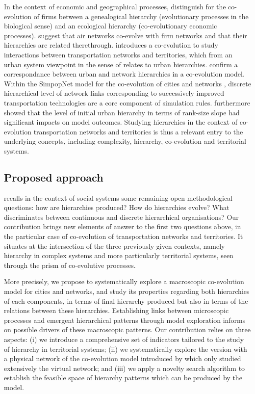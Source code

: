 \documentclass[english,fleqn,allpages]{ISTE_science}[2018/07/30]
\begin{document}
In the context of economic and geographical processes, \cite{volberda2003co} distinguish for the co-evolution of firms between a genealogical hierarchy (evolutionary processes in the biological sense) and an ecological hierarchy (co-evolutionary economic processes). \cite{liu2013exploring} suggest that air networks co-evolve with firm networks and that their hierarchies are related therethrough. \cite{raimbault2019modeling} introduces a co-evolution to study interactions between transportation networks and territories, which from an urban system viewpoint in the sense of \cite{pumain2006evolutionary} relates to urban hierarchies. \cite{levinson2007co} confirm a correspondance between urban and network hierarchies in a co-evolution model. Within the SimpopNet model for the co-evolution of cities and networks \citep{schmitt2014modelisation}, discrete hierarchical level of network links corresponding to successively improved transportation technologies are a core component of simulation rules. \cite{raimbault2020unveiling} furthermore showed that the level of initial urban hierarchy in terms of rank-size slope had significant impacts on model outcomes. Studying hierarchies in the context of co-evolution transportation networks and territories is thus a relevant entry to the underlying concepts, including complexity, hierarchy, co-evolution and territorial systems.



\subsection{Proposed approach}

\cite{pumain2006introduction} recalls in the context of social systems some remaining open methodological questions: how are hierarchies produced? How do hierarchies evolve? What discriminates between continuous and discrete hierarchical organisations? Our contribution brings new elements of answer to the first two questions above, in the particular case of co-evolution of transportation networks and territories. It situates at the intersection of the three previously given contexts, namely hierarchy in complex systems and more particularly territorial systems, seen through the prism of co-evolutive processes.

More precisely, we propose to systematically explore a macroscopic co-evolution model for cities and networks, and study its properties regarding both hierarchies of each components, in terms of final hierarchy produced but also in terms of the relations between these hierarchies. Establishing links between microscopic processes and emergent hierarchical patterns through model exploration informs on possible drivers of these macroscopic patterns. Our contribution relies on three aspects: (i) we introduce a comprehensive set of indicators tailored to the study of hierarchy in territorial systems; (ii) we systematically explore the version with a physical network of the co-evolution model introduced by \cite{raimbault2018modeling} which only studied extensively the virtual network; and (iii) we apply a novelty search algorithm to establish the feasible space of hierarchy patterns which can be produced by the model.
\end{document}
